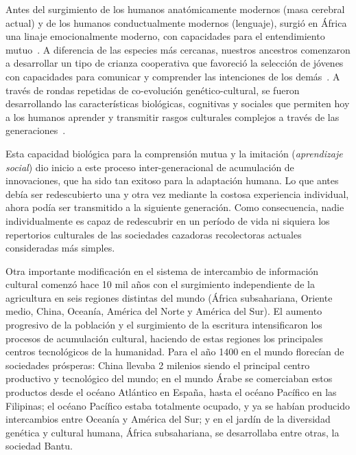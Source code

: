 \documentclass[a4paper,11pt]{book}
\theoremstyle{definition}
\begin{document}

Antes del surgimiento de los humanos anat\'omicamente modernos (masa cerebral actual) y de los humanos conductualmente modernos (lenguaje), surgi\'o en \'Africa una linaje emocionalmente moderno, con capacidades para el entendimiento mutuo~\cite{Hrdy2020}.
%
A diferencia de las especies m\'as cercanas, nuestros ancestros comenzaron a desarrollar un tipo de crianza cooperativa que favoreci\'o la selecci\'on de j\'ovenes con capacidades para comunicar y comprender las intenciones de los dem\'as~\cite{Hrdy2020}.
%
A trav\'es de rondas repetidas de co-evoluci\'on gen\'etico-cultural, se fueron desarrollando las caracter\'isticas biol\'ogicas, cognitivas y sociales que permiten hoy a los humanos aprender y transmitir rasgos culturales complejos a trav\'es de las generaciones~\cite{Jones2011}.

%

Esta capacidad biol\'ogica para la comprensi\'on mutua y la imitaci\'on (\emph{aprendizaje social}) dio inicio a este proceso inter-generacional de acumulaci\'on de innovaciones, que ha sido tan exitoso para la adaptaci\'on humana.
%
Lo que antes deb\'ia ser redescubierto una y otra vez mediante la costosa experiencia individual, ahora pod\'ia ser transmitido a la siguiente generaci\'on.
%
Como consecuencia, nadie individualmente es capaz de redescubrir en un per\'iodo de vida ni siquiera los repertorios culturales de las sociedades cazadoras recolectoras actuales consideradas m\'as simples.


Otra importante modificaci\'on en el sistema de intercambio de informaci\'on cultural comenz\'o hace 10 mil a\~nos con el surgimiento independiente de la agricultura en seis regiones distintas del mundo (\'Africa subsahariana, Oriente medio, China, Ocean\'ia, Am\'erica del Norte y Am\'erica del Sur).
%
El aumento progresivo de la poblaci\'on y el surgimiento de la escritura intensificaron los procesos de acumulaci\'on cultural, haciendo de estas regiones los principales centros tecnol\'ogicos de la humanidad.
%
Para el a\~no 1400 en el mundo florec\'ian de sociedades pr\'osperas: China llevaba 2 milenios siendo el principal centro productivo y tecnol\'ogico del mundo; en el mundo \'Arabe se comerciaban estos productos desde el oc\'eano Atl\'antico en Espa\~na, hasta el oc\'eano Pac\'ifico en las Filipinas; el oc\'eano Pac\'ifico estaba totalmente ocupado, y ya se hab\'ian producido intercambios entre Ocean\'ia y Am\'erica del Sur; y en el jard\'in de la diversidad gen\'etica y cultural humana, \'Africa subsahariana, se desarrollaba entre otras, la sociedad Bantu.
\end{document}
